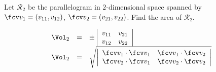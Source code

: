 \begin{frame}
\begin{example}
Let $\mathcal R_2$ be the parallelogram in $2$-dimensional space spanned by $\fcv v_1=(v_{11},v_{12})$, $\fcv v_2=(v_{21}, v_{22})$. Find the area of $\mathcal R_2$.

\[
\begin{array}{rcl}
\Vol_2&=&\pm \left|\begin{array}{cc} v_{11} & v_{21}\\ v_{12}& v_{22}\end{array}\right| \\
\Vol_2&=& \sqrt{ \left|\begin{array}{cc} \fcv v_1\cdot \fcv v_1 & \fcv v_1\cdot \fcv v_2\\ \fcv v_2\cdot \fcv v_1 & \fcv v_2\cdot \fcv v_2\end{array}\right| }
\end{array}
\]
\end{example}
\end{frame}